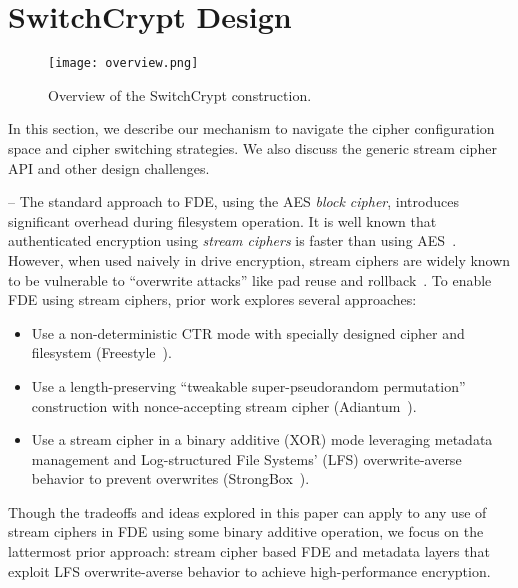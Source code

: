 \section{SwitchCrypt Design}\label{sec:design}

\begin{figure}[t]
   \centering
   \texttt{[image: overview.png]}
   \caption{Overview of the SwitchCrypt construction.}\label{fig:overview}
\end{figure}

In this section, we describe our mechanism to navigate the cipher configuration
space and cipher switching strategies. We also discuss the generic stream
cipher API and other design challenges.

--
The standard approach to FDE, using the AES \emph{block cipher}, introduces
significant overhead during filesystem operation. It is well known that
authenticated encryption using \emph{stream ciphers} is faster than using
AES~\cite{StrongBox, AnotherPaper1, AnotherPaper2}. However, when used naively
in drive encryption, stream ciphers are widely known to be vulnerable to
``overwrite attacks'' like pad reuse and rollback~\cite{KatzLindell, StrongBox}.
To enable FDE using stream ciphers, prior work explores several approaches:

\begin{itemize}
   \item Use a non-deterministic CTR mode with specially designed cipher and
   filesystem (Freestyle~\cite{Freestyle}).
   \item Use a length-preserving ``tweakable super-pseudorandom permutation''
   construction with nonce-accepting stream cipher (Adiantum~\cite{Adiantum}).
   \item Use a stream cipher in a binary additive (XOR) mode leveraging metadata
   management and Log-structured File Systems' (LFS) overwrite-averse behavior
   to prevent overwrites (StrongBox~\cite{StrongBox}).
\end{itemize}

Though the tradeoffs and ideas explored in this paper can apply to any use of
stream ciphers in FDE using some binary additive operation, we focus on the
lattermost prior approach: stream cipher based FDE and metadata
layers that exploit LFS overwrite-averse behavior to achieve high-performance
encryption.


